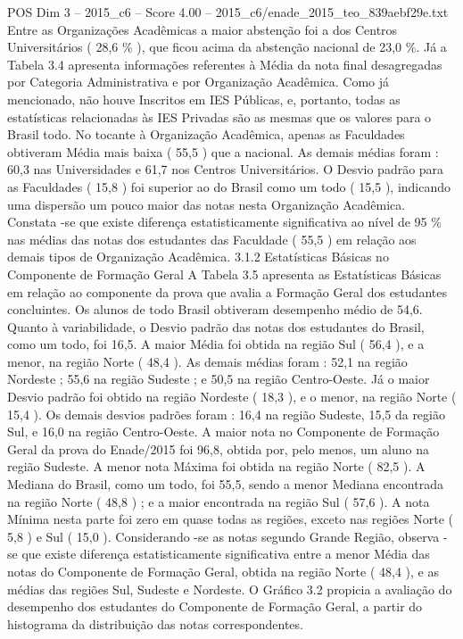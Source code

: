 \begin{textsample}{POS Dim 3 – 2015\_c6 – Score 4.00 – 2015\_c6/enade\_2015\_teo\_839aebf29e.txt}
Entre as Organizações Acadêmicas a maior abstenção foi a dos Centros Universitários ( 28,6 \% ), que ficou acima da abstenção nacional de 23,0 \%.
Já a Tabela 3.4 apresenta informações referentes à Média da nota final desagregadas por Categoria Administrativa e por Organização Acadêmica.
Como já mencionado, não houve Inscritos em IES Públicas, e, portanto, todas as estatísticas relacionadas às IES Privadas são as mesmas que os valores para o Brasil todo.
No tocante à Organização Acadêmica, apenas as Faculdades obtiveram Média mais baixa ( 55,5 ) que a nacional.
As demais médias foram : 60,3 nas Universidades e 61,7 nos Centros Universitários.
O Desvio padrão para as Faculdades ( 15,8 ) foi superior ao do Brasil como um todo ( 15,5 ), indicando uma dispersão um pouco maior das notas nesta Organização Acadêmica.
Constata -se que existe diferença estatisticamente significativa ao nível de 95 \% nas médias das notas dos estudantes das Faculdade ( 55,5 ) em relação aos demais tipos de Organização Acadêmica. 3.1.2 Estatísticas Básicas no Componente de Formação Geral A Tabela 3.5 apresenta as Estatísticas Básicas em relação ao componente da prova que avalia a Formação Geral dos estudantes concluintes.
Os alunos de todo Brasil obtiveram desempenho médio de 54,6.
Quanto à variabilidade, o Desvio padrão das notas dos estudantes do Brasil, como um todo, foi 16,5.
A maior Média foi obtida na região Sul ( 56,4 ), e a menor, na região Norte ( 48,4 ).
As demais médias foram : 52,1 na região Nordeste ; 55,6 na região Sudeste ; e 50,5 na região Centro-Oeste.
Já o maior Desvio padrão foi obtido na região Nordeste ( 18,3 ), e o menor, na região Norte ( 15,4 ).
Os demais desvios padrões foram : 16,4 na região Sudeste, 15,5 da região Sul, e 16,0 na região Centro-Oeste.
A maior nota no Componente de Formação Geral da prova do Enade/2015 foi 96,8, obtida por, pelo menos, um aluno na região Sudeste.
A menor nota Máxima foi obtida na região Norte ( 82,5 ).
A Mediana do Brasil, como um todo, foi 55,5, sendo a menor Mediana encontrada na região Norte ( 48,8 ) ; e a maior encontrada na região Sul ( 57,6 ).
A nota Mínima nesta parte foi zero em quase todas as regiões, exceto nas regiões Norte ( 5,8 ) e Sul ( 15,0 ).
Considerando -se as notas segundo Grande Região, observa -se que existe diferença estatisticamente significativa entre a menor Média das notas do Componente de Formação Geral, obtida na região Norte ( 48,4 ), e as médias das regiões Sul, Sudeste e Nordeste.
O Gráfico 3.2 propicia a avaliação do desempenho dos estudantes do Componente de Formação Geral, a partir do histograma da distribuição das notas correspondentes.

\end{textsample}
